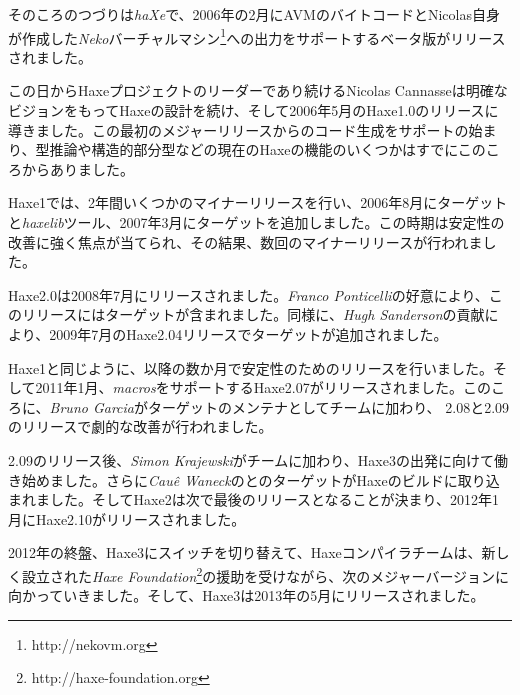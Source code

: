 そのころのつづりは\emph{haXe}で、2006年の2月にAVMのバイトコードとNicolas自身が作成した\emph{Neko}バーチャルマシン\footnote{http://nekovm.org}への出力をサポートするベータ版がリリースされました。

この日からHaxeプロジェクトのリーダーであり続けるNicolas Cannasseは明確なビジョンをもってHaxeの設計を続け、そして2006年5月のHaxe1.0のリリースに導きました。この最初のメジャーリリースからのコード生成をサポートの始まり、型推論や構造的部分型などの現在のHaxeの機能のいくつかはすでにこのころからありました。

Haxe1では、2年間いくつかのマイナーリリースを行い、2006年8月にターゲットと\emph{haxelib}ツール、2007年3月にターゲットを追加しました。この時期は安定性の改善に強く焦点が当てられ、その結果、数回のマイナーリリースが行われました。

Haxe2.0は2008年7月にリリースされました。\emph{Franco Ponticelli}の好意により、このリリースにはターゲットが含まれました。同様に、\emph{Hugh Sanderson}の貢献により、2009年7月のHaxe2.04リリースでターゲットが追加されました。

Haxe1と同じように、以降の数か月で安定性のためのリリースを行いました。そして2011年1月、\emph{macros}をサポートするHaxe2.07がリリースされました。このころに、\emph{Bruno Garcia}がターゲットのメンテナとしてチームに加わり、 2.08と2.09のリリースで劇的な改善が行われました。

2.09のリリース後、\emph{Simon Krajewski}がチームに加わり、Haxe3の出発に向けて働き始めました。さらに\emph{Cau\^{e} Waneck}のとのターゲットがHaxeのビルドに取り込まれました。そしてHaxe2は次で最後のリリースとなることが決まり、2012年1月にHaxe2.10がリリースされました。

2012年の終盤、Haxe3にスイッチを切り替えて、Haxeコンパイラチームは、新しく設立された\emph{Haxe Foundation}\footnote{http://haxe-foundation.org}の援助を受けながら、次のメジャーバージョンに向かっていきました。そして、Haxe3は2013年の5月にリリースされました。

